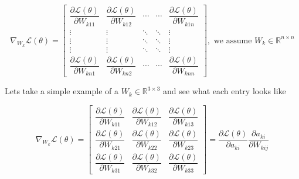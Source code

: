 \documentclass[11pt, a4paper]{article}
\begin{document}
\[
\nabla_{W_k} \mathscr{L}(\theta)
=
\begin{bmatrix}
\dfrac{\partial \mathscr{L}(\theta)}{\partial W_{k11}} & \dfrac{\partial \mathscr{L}(\theta)}{\partial W_{k12}} & \cdots & \cdots & \dfrac{\partial \mathscr{L}(\theta)}{\partial W_{k1n}} \\
\vdots & \vdots & \ddots & \ddots & \vdots \\
\vdots & \vdots & \ddots & \ddots & \vdots \\
\vdots & \vdots & \ddots & \ddots & \vdots \\
\dfrac{\partial \mathscr{L}(\theta)}{\partial W_{kn1}} & \dfrac{\partial \mathscr{L}(\theta)}{\partial W_{kn2}} & \cdots & \cdots & \dfrac{\partial \mathscr{L}(\theta)}{\partial W_{knn}}
\end{bmatrix}, \text{ we assume } W_k \in \mathbb{R}^{n \times n}
\]

\vspace{0.3cm}

Lets take a simple example of a $W_k \in \mathbb{R}^{3 \times 3}$ and see what each entry looks like

\[
\nabla_{W_k} \mathscr{L}(\theta) =
\begin{bmatrix}
\dfrac{\partial \mathscr{L}(\theta)}{\partial W_{k11}} & \dfrac{\partial \mathscr{L}(\theta)}{\partial W_{k12}} & \dfrac{\partial \mathscr{L}(\theta)}{\partial W_{k13}} \\[1.5em]
\dfrac{\partial \mathscr{L}(\theta)}{\partial W_{k21}} & \dfrac{\partial \mathscr{L}(\theta)}{\partial W_{k22}} & \dfrac{\partial \mathscr{L}(\theta)}{\partial W_{k23}} \\[1.5em]
\dfrac{\partial \mathscr{L}(\theta)}{\partial W_{k31}} & \dfrac{\partial \mathscr{L}(\theta)}{\partial W_{k32}} & \dfrac{\partial \mathscr{L}(\theta)}{\partial W_{k33}}
\end{bmatrix}
= \dfrac{\partial \mathscr{L}(\theta)}{\partial a_{ki}} \dfrac{\partial a_{ki}}{\partial W_{kij}}
\]

\vspace{0.3cm}
\end{document}
